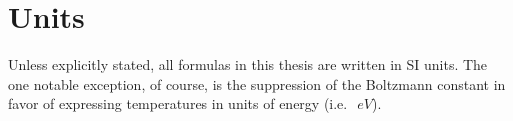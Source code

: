 \section{Units}
Unless explicitly stated, all formulas in this thesis are written in SI units.
The one notable exception, of course,
is the suppression of the Boltzmann constant
in favor of expressing temperatures in units of energy
(i.e.\ $\SI{}{eV}$).




